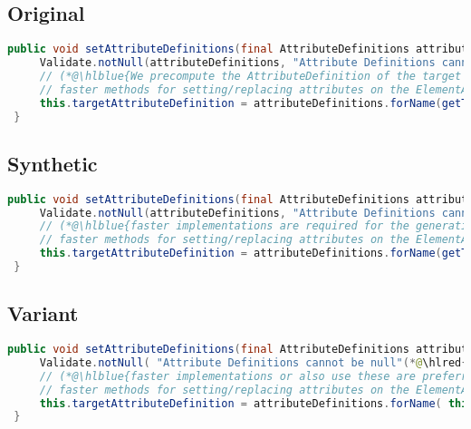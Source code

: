 \documentclass[11pt]{article}
\DeclareRobustCommand{\hlred}[1]{{\sethlcolor{YellowOrange}\hl{#1}}}
\DeclareRobustCommand{\hlblue}[1]{{\sethlcolor{SeaGreen}\hl{#1}}}
\DeclareRobustCommand{\hlblue}[1]{{\sethlcolor{SkyBlue}\hl{#1}}}
\begin{document}
\subsection{Original}
\begin{lstlisting}[language=java]
 public void setAttributeDefinitions(final AttributeDefinitions attributeDefinitions) {
     Validate.notNull(attributeDefinitions, "Attribute Definitions cannot be null");
     // (*@\hlblue{We precompute the AttributeDefinition of the target attribute in order to being able to use much}@*)
     // faster methods for setting/replacing attributes on the ElementAttributes implementation
     this.targetAttributeDefinition = attributeDefinitions.forName(getTemplateMode(), this.targetAttrCompleteName);
 }
\end{lstlisting}
\subsection{Synthetic}

\begin{lstlisting}[language=java]
 public void setAttributeDefinitions(final AttributeDefinitions attributeDefinitions) {
     Validate.notNull(attributeDefinitions, "Attribute Definitions cannot be null");
     // (*@\hlblue{faster implementations are required for the generation but cannot override or replace attributes instead of just}@*)
     // faster methods for setting/replacing attributes on the ElementAttributes implementation
     this.targetAttributeDefinition = attributeDefinitions.forName(getTemplateMode(), this.targetAttrCompleteName);
 }
\end{lstlisting}

\subsection{Variant}

\begin{lstlisting}[language=java]
 public void setAttributeDefinitions(final AttributeDefinitions attributeDefinitions) {
     Validate.notNull( "Attribute Definitions cannot be null"(*@\hlred{,attributeDefinitions}@*));
     // (*@\hlblue{faster implementations or also use these are preferred for all other or even using other than}@*)
     // faster methods for setting/replacing attributes on the ElementAttributes implementation
     this.targetAttributeDefinition = attributeDefinitions.forName( this.targetAttrCompleteName(*@\hlred{,getTemplateMode())}@*);
 }
\end{lstlisting}
\end{document}

